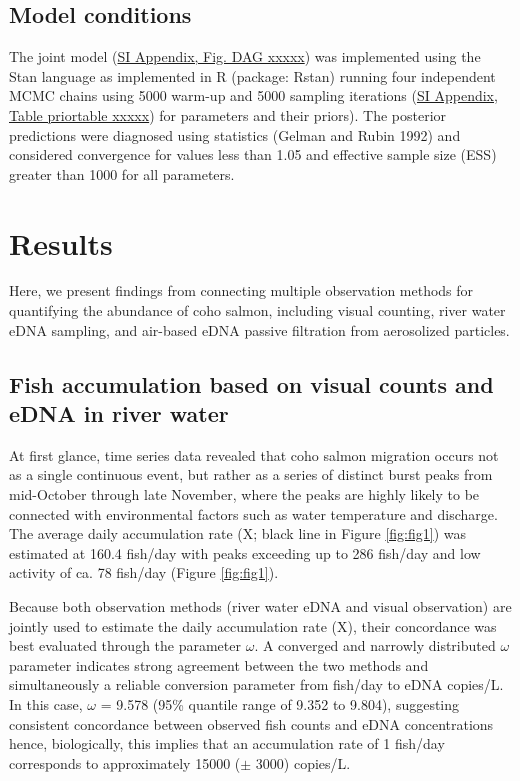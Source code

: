 \documentclass{article}
\begin{document}
\subsection{Model conditions}

The joint model (\href{SI_Appendix.pdf}{SI Appendix, Fig. DAG xxxxx}) was implemented using the Stan language as implemented in R (package: Rstan) running four independent MCMC chains using 5000 warm-up and 5000 sampling iterations (\href{SI_Appendix.pdf}{SI Appendix, Table priortable xxxxx}) for parameters and their priors). The posterior predictions were diagnosed using statistics (Gelman and Rubin 1992) and considered convergence for values less than 1.05 and effective sample size (ESS) greater than 1000 for all parameters.

\clearpage
\section{Results}
Here, we present findings from connecting multiple observation methods for quantifying the abundance of coho salmon, including visual counting, river water eDNA sampling, and air-based eDNA passive filtration from aerosolized particles.

\subsection{Fish accumulation based on visual counts and eDNA in river water}
At first glance, time series data revealed that coho salmon migration occurs not as a single continuous event, but rather as a series of distinct burst peaks from mid-October through late November, where the peaks are highly likely to be connected with environmental factors such as water temperature and discharge. The average daily accumulation rate (X; black line in Figure \ref{fig:fig1}) was estimated at 160.4 fish/day with peaks exceeding up to 286 fish/day and low activity of ca. 78 fish/day (Figure \ref{fig:fig1}).


Because both observation methods (river water eDNA and visual observation) are jointly used to estimate the daily accumulation rate (X), their concordance was best evaluated through the parameter $\omega$. A converged and narrowly distributed $\omega$ parameter indicates strong agreement between the two methods and simultaneously a reliable conversion parameter from fish/day to eDNA copies/L. In this case, $\omega$ = 9.578 (95\% quantile range of 9.352 to 9.804), suggesting consistent concordance between observed fish counts and eDNA concentrations hence, biologically, this implies that an accumulation rate of 1 fish/day corresponds to approximately 15000 ($\pm$ 3000) copies/L.
\end{document}
